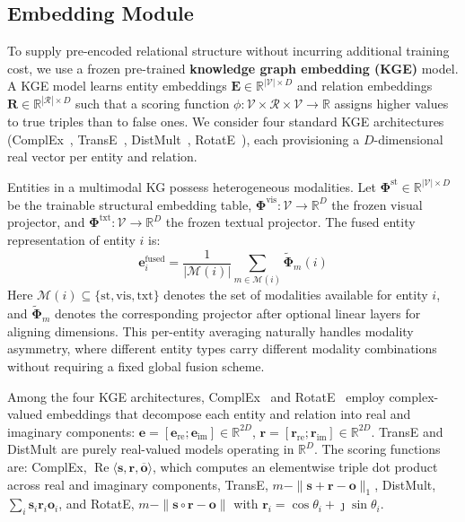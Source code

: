 \vspace{-1em}
\subsection{Embedding Module}
\vspace{-1em}
\label{sec:embedding-module}

To supply pre-encoded relational structure without incurring additional training cost, we
use a frozen pre-trained \textbf{knowledge graph embedding (KGE)} model.  A KGE model
learns entity embeddings
$\mathbf{E} \in \mathbb{R}^{|\mathcal{V}| \times D}$ and relation embeddings
$\mathbf{R} \in \mathbb{R}^{|\mathcal{R}| \times D}$ such that a scoring function
$\phi: \mathcal{V} \times \mathcal{R} \times \mathcal{V} \to \mathbb{R}$
assigns higher values to true triples than to false ones.  We consider four standard
KGE architectures (ComplEx~\cite{trouillon2016complex}, TransE~\cite{bordes2013translating},
DistMult~\cite{yang2015embedding}, RotatE~\cite{sun2019rotate}), each provisioning a
$D$-dimensional real vector per entity and relation.

Entities in a multimodal KG possess heterogeneous modalities.  Let
$\boldsymbol{\Phi}^{\text{st}} \in \mathbb{R}^{|\mathcal{V}| \times D}$ be the trainable
structural embedding table, $\boldsymbol{\Phi}^{\text{vis}}: \mathcal{V} \to \mathbb{R}^{D}$
the frozen visual projector, and $\boldsymbol{\Phi}^{\text{txt}}: \mathcal{V} \to \mathbb{R}^{D}$
the frozen textual projector.  The fused entity representation of entity $i$ is:
\begin{equation}
\mathbf{e}^{\text{fused}}_i = \frac{1}{|\mathcal{M}(i)|}\sum_{m \in \mathcal{M}(i)} \tilde{\boldsymbol{\Phi}}_m(i)
\label{eq:fused-emb}
\end{equation}
Here $\mathcal{M}(i) \subseteq \{\text{st}, \text{vis}, \text{txt}\}$ denotes the set of modalities
available for entity $i$, and $\tilde{\boldsymbol{\Phi}}_m$ denotes the corresponding
projector after optional linear layers for aligning dimensions.  This per-entity averaging
naturally handles modality asymmetry, where different entity types carry different modality
combinations without requiring a fixed global fusion scheme.

Among the four KGE architectures, ComplEx~\cite{trouillon2016complex} and
RotatE~\cite{sun2019rotate} employ complex-valued embeddings that decompose each entity
and relation into real and imaginary components:
$\mathbf{e} = [\mathbf{e}_{\text{re}}; \mathbf{e}_{\text{im}}] \in \mathbb{R}^{2D}$,
$\mathbf{r} = [\mathbf{r}_{\text{re}}; \mathbf{r}_{\text{im}}] \in \mathbb{R}^{2D}$.
TransE and DistMult are purely real-valued models operating in $\mathbb{R}^D$.  The
scoring functions are: ComplEx, $\operatorname{Re}\langle \mathbf{s}, \mathbf{r}, \overline{\mathbf{o}} \rangle$, which computes an elementwise triple dot product across real and imaginary components, TransE,
$m - \|\mathbf{s} + \mathbf{r} - \mathbf{o}\|_1$, DistMult, $\sum_i \mathbf{s}_i \mathbf{r}_i \mathbf{o}_i$,
and RotatE, $m - \|\mathbf{s} \circ \mathbf{r} - \mathbf{o}\|$ with $\mathbf{r}_i = \cos\theta_i + \jmath\sin\theta_i$.

